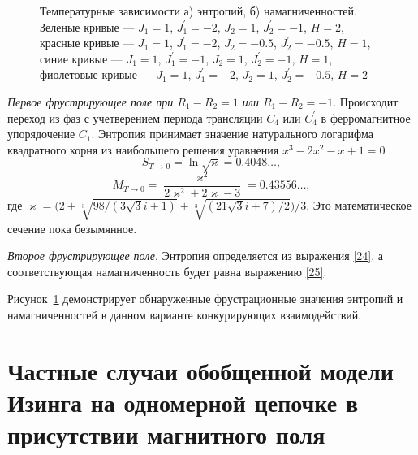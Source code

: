  \begin{figure}[h]
 	\begin{minipage}{0.47\linewidth}
 	\end{minipage}
 	\hfill
 	\begin{minipage}{0.47\linewidth}
 	\end{minipage}
 	\caption{Температурные зависимости а) энтропий, б) намагниченностей. Зеленые кривые --- $J_1 = 1$, $J_1^{'} = -2$, $J_2 = 1$, $J_2^{'} = -1$, $H = 2$, красные кривые --- $J_1 = 1$, $J_1^{'} = -2$, $J_2 = -0.5$, $J_2^{'} = -0.5$, $H = 1$, синие кривые --- $J_1 = 1$, $J_1^{'} = -1$, $J_2 = 1$, $J_2^{'} = -1$, $H = 1$, фиолетовые кривые --- $J_1 = 1$, $J_1^{'} = -2$, $J_2 = 1$, $J_2^{'} = -0.5$, $H = 2$}
 	\label{EntAndMagGenChain2}
 \end{figure}

\emph{Первое фрустрирующее поле при $R_1 - R_2 = 1$ или $R_1 - R_2 = -1$}. Происходит переход из фаз с учетверением периода трансляции $C_4$ или $C_4^{'}$ в ферромагнитное упорядочение $C_1$. Энтропия принимает значение натурального логарифма квадратного корня из наибольшего решения уравнения \mbox{$x^3-2x^2-x+1=0$}
\begin{equation}
S_{T\rightarrow 0} = \ln \sqrt{\varkappa} = 0.4048\dots,
\label{37}
\end{equation}
\begin{equation}
M_{T\rightarrow 0} = \frac{\varkappa^2}{2\varkappa^2+2\varkappa-3} = 0.43556\dots,
\label{38}
\end{equation}
где $\varkappa = \Big(2+\sqrt[3]{98/(3\sqrt{3}i+1)}+\sqrt[3]{(21\sqrt{3}i+7)/2}\Big)/3$. Это математическое сечение пока безымянное.

\emph{Второе фрустрирующее поле}. Энтропия определяется из выражения \eqref{24}, а соответствующая намагниченность будет равна выражению \eqref{25}.

Рисунок~\ref{EntAndMagGenChain2} демонстрирует обнаруженные фрустрационные значения энтропий и намагниченностей в данном варианте конкурирующих взаимодействий.

\section{Частные случаи обобщенной модели Изинга на одномерной цепочке в присутствии магнитного поля}

